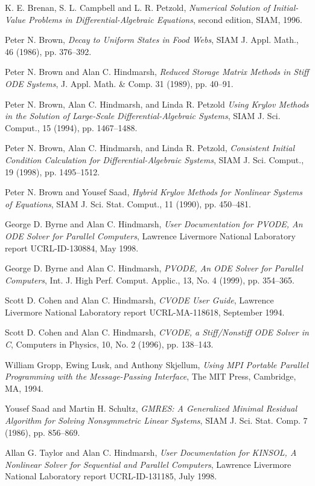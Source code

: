 \begin{thebibliography}{9}

K. E. Brenan, S. L. Campbell and L. R. Petzold, {\em Numerical Solution
of Initial-Value Problems in Differential-Algebraic Equations}, second
edition, SIAM, 1996.

Peter N. Brown, {\em Decay to Uniform States in Food Webs},
SIAM J. Appl.  Math., 46 (1986), pp. 376--392.

Peter N. Brown and Alan C. Hindmarsh, {\it Reduced Storage Matrix Methods
in Stiff ODE Systems}, J. Appl. Math. \& Comp. 31 (1989), pp. 40--91.

Peter N. Brown,  Alan C. Hindmarsh, and Linda R. Petzold {\em Using Krylov
Methods in the Solution of Large-Scale Differential-Algebraic Systems}, 
SIAM J. Sci. Comput., 15 (1994), pp. 1467--1488.

Peter N. Brown, Alan C. Hindmarsh, and Linda R. Petzold, {\em Consistent
Initial Condition Calculation for Differential-Algebraic Systems}, 
SIAM J. Sci. Comput., 19 (1998), pp. 1495--1512.

Peter N. Brown and Yousef Saad, {\it Hybrid Krylov Methods for 
Nonlinear Systems of Equations}, SIAM J. Sci. Stat. Comput., 11 (1990), 
pp. 450--481.

George D. Byrne and Alan C. Hindmarsh, {\it User Documentation for PVODE, 
An ODE Solver for Parallel Computers}, Lawrence Livermore National 
Laboratory report UCRL-ID-130884, May 1998.

George D. Byrne and Alan C. Hindmarsh,
{\it PVODE, An ODE Solver for Parallel Computers}, 
Int. J. High Perf. Comput. Applic., 13, No. 4 (1999), pp. 354--365.

Scott D. Cohen and Alan C. Hindmarsh, {\it CVODE User Guide},
Lawrence Livermore National Laboratory report UCRL-MA-118618,
September 1994.

Scott D. Cohen and Alan C. Hindmarsh, {\it CVODE, a Stiff/Nonstiff ODE
Solver in C}, Computers in Physics, 10, No. 2 (1996), pp. 138--143.

William Gropp, Ewing Lusk, and Anthony Skjellum, {\it Using MPI
Portable Parallel Programming with the Message-Passing Interface},
The MIT Press, Cambridge, MA, 1994.

Yousef Saad and Martin H. Schultz, {\em GMRES: A Generalized Minimal Residual
Algorithm for Solving Nonsymmetric Linear Systems}, SIAM J. Sci. Stat.
Comp. 7 (1986), pp. 856--869.

Allan G. Taylor and Alan C. Hindmarsh, {\em User Documentation for
KINSOL, A Nonlinear Solver for Sequential and Parallel Computers},
Lawrence Livermore National Laboratory report UCRL-ID-131185, July 1998.

\end{thebibliography}


